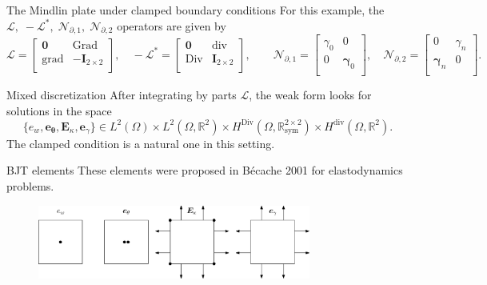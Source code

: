 \documentclass[aspectratio=169]{ISAE-Beamer}
\DeclareMathOperator*{\grad}{grad}
\DeclareMathOperator*{\Grad}{Grad}
\DeclareMathOperator*{\Div}{Div}
\renewcommand{\div}{\operatorname{div}}
\newcommand{\bbR}{\mathbb{R}}
\begin{document}
\begin{frame}{The Mindlin plate under clamped boundary conditions}
For this example, the $\mathcal{L}, \; -\mathcal{L}^*, \; \mathcal{N}_{\partial, 1}, \; \mathcal{N}_{\partial, 2}$ operators are given by
\begin{equation*}
\mathcal{L} = \begin{bmatrix}
\bm{0} & \Grad\\
\grad & -\bm{I}_{2 \times 2}\\
\end{bmatrix}, \quad
-\mathcal{L}^* = \begin{bmatrix}
\bm{0} & \div\\
\Div & \bm{I}_{2 \times 2}\\
\end{bmatrix}, \qquad
\mathcal{N}_{\partial, 1} = \begin{bmatrix}
\gamma_0 & 0 \\ 
0 &  \bm\gamma_0\\
\end{bmatrix}, \quad 
\mathcal{N}_{\partial, 2} = \begin{bmatrix}
0 & \gamma_{n}  \\
\bm\gamma_n & 0 \\
\end{bmatrix}.
\end{equation*}

\end{frame}

\begin{frame}{Mixed discretization}
\setlength{\abovedisplayskip}{3pt}
\setlength{\belowdisplayskip}{3pt}
After integrating by parts $\mathcal{L}$, the weak form looks for solutions in the space
$$\{e_w, \bm{e}_{\bm{\theta}}, \bm{E}_{\kappa}, \bm{e}_{\gamma}\} \in L^2(\Omega) \times L^2(\Omega, \bbR^2) \times H^{\Div}(\Omega, \bbR^{2\times 2}_{\text{sym}}) \times H^{\div}(\Omega, \bbR^2).$$
The clamped condition is a natural one in this setting.
\begin{block}{BJT elements}
These elements were proposed in Bécache 2001 for elastodynamics problems.
\begin{figure}
\centering
\includegraphics[width=0.8\textwidth]{presentation/fe_BJT.eps}
\end{figure}
		
\end{block}

\end{frame}
\end{document}
